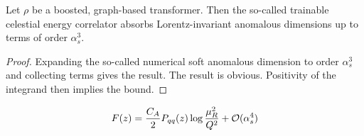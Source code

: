 \begin{corollary}\label{thm:1}
Let $\rho$ be a boosted, graph-based transformer. Then the so-called
trainable celestial energy correlator absorbs Lorentz-invariant
anomalous dimensions up to terms of order $\alpha_s^3$.
\end{corollary}

\begin{proof}
Expanding the so-called numerical soft anomalous dimension to order
$\alpha_s^3$ and collecting terms gives the result. The result is
obvious. Positivity of the integrand then implies the bound.
\end{proof}

\begin{equation}
  F(z) = \frac{C_A}{2} P_{qq}(z) \log\frac{\mu_R^2}{Q^2} + \mathcal{O}(\alpha_s^{4})
  \label{eq:3}
\end{equation}

